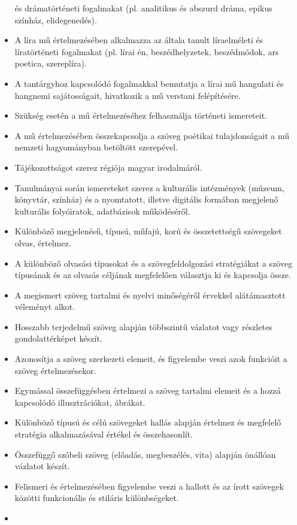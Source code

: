 \begin{itemize}
  és drámatörténeti fogalmakat (pl. analitikus és abszurd dráma, epikus
  színház, elidegenedés).
\item
  A líra mű értelmezésében alkalmazza az általa tanult líraelméleti és
  líratörténeti fogalmakat (pl. lírai én, beszédhelyzetek, beszédmódok,
  ars poetica, szereplíra).
\item
  A tantárgyhoz kapcsolódó fogalmakkal bemutatja a lírai mű hangulati és
  hangnemi sajátosságait, hivatkozik a mű verstani felépítésére.
\item
  Szükség esetén a mű értelmezéséhez felhasználja történeti ismereteit.
\item
  A mű értelmezésében összekapcsolja a szöveg poétikai tulajdonságait a
  mű nemzeti hagyományban betöltött szerepével.
\item
  Tájékozottságot szerez régiója magyar irodalmáról.
\item
  Tanulmányai során ismereteket szerez a kulturális intézmények (múzeum,
  könyvtár, színház) és a nyomtatott, illetve digitális formában
  megjelenő kulturális folyóiratok, adatbázisok működéséről.
\item
  Különböző megjelenésű, típusú, műfajú, korú és összetettségű
  szövegeket olvas, értelmez.
\item
  A különböző olvasási típusokat és a szövegfeldolgozási stratégiákat a
  szöveg típusának és az olvasás céljának megfelelően választja ki és
  kapcsolja össze.
\item
  A megismert szöveg tartalmi és nyelvi minőségéről érvekkel
  alátámasztott véleményt alkot.
\item
  Hosszabb terjedelmű szöveg alapján többszintű vázlatot vagy részletes
  gondolattérképet készít.
\item
  Azonosítja a szöveg szerkezeti elemeit, és figyelembe veszi azok
  funkcióit a szöveg értelmezésekor.
\item
  Egymással összefüggésben értelmezi a szöveg tartalmi elemeit és a
  hozzá kapcsolódó illusztrációkat, ábrákat.
\item
  Különböző típusú és célú szövegeket hallás alapján értelmez és
  megfelelő stratégia alkalmazásával értékel és összehasonlít.
\item
  Összefüggő szóbeli szöveg (előadás, megbeszélés, vita) alapján
  önállóan vázlatot készít.
\item
  Felismeri és értelmezésében figyelembe veszi a hallott és az írott
  szövegek közötti funkcionális és stiláris különbségeket.
\item

\end{itemize}
